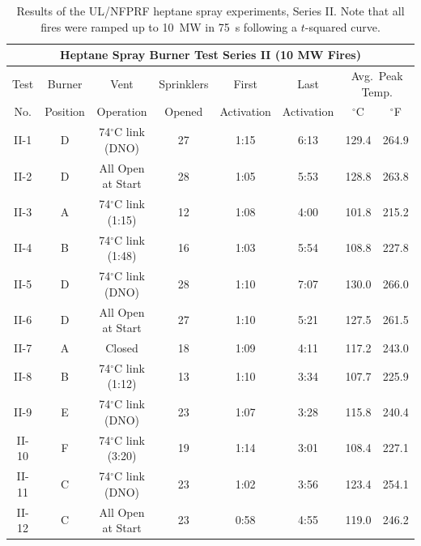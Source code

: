 \begin{table}[ht!]
\begin{center}
\begin{tabular}{|c||c|c|c|c|c|c|c|}
\hline
\multicolumn{8}{|c|}{\bf Heptane Spray Burner Test Series II (10 MW Fires)}\\ \hline \hline
Test & Burner   & Vent      & Sprinklers & First      & Last      & \multicolumn{2}{|c|}{Avg.~Peak Temp.} \\ \cline{7-8}
No.  & Position & Operation & Opened     & Activation & Activation & $^\circ$C & $^\circ$F   \\
\hline \hline
II-1  & D  & 74$^\circ$C link (DNO)  & 27 & 1:15 & 6:13 & 129.4 &264.9 \\ \hline
II-2  & D  & All Open at Start       & 28 & 1:05 & 5:53 & 128.8 &263.8 \\ \hline
II-3  & A  & 74$^\circ$C link (1:15) & 12 & 1:08 & 4:00 & 101.8 &215.2 \\ \hline
II-4  & B  & 74$^\circ$C link (1:48) & 16 & 1:03 & 5:54 & 108.8 &227.8 \\ \hline
II-5  & D  & 74$^\circ$C link (DNO)  & 28 & 1:10 & 7:07 & 130.0 &266.0 \\ \hline
II-6  & D  & All Open at Start       & 27 & 1:10 & 5:21 & 127.5 &261.5 \\ \hline
II-7  & A  & Closed                  & 18 & 1:09 & 4:11 & 117.2 &243.0 \\ \hline
II-8  & B  & 74$^\circ$C link (1:12) & 13 & 1:10 & 3:34 & 107.7 &225.9 \\ \hline
II-9  & E  & 74$^\circ$C link (DNO)  & 23 & 1:07 & 3:28 & 115.8 &240.4 \\ \hline
II-10 & F  & 74$^\circ$C link (3:20) & 19 & 1:14 & 3:01 & 108.4 &227.1 \\ \hline
II-11 & C  & 74$^\circ$C link (DNO)  & 23 & 1:02 & 3:56 & 123.4 &254.1 \\ \hline
II-12 & C  & All Open at Start       & 23 & 0:58 & 4:55 & 119.0 &246.2 \\ \hline
\end{tabular}
\end{center}
\caption[Results of the UL/NFPRF heptane spray experiments, Series~II]
{Results of the UL/NFPRF heptane spray experiments, Series II. Note that all fires were ramped up to 10~MW in 75~s following a $t$-squared curve.}
\label{ULburnermatrixII}
\end{table}


